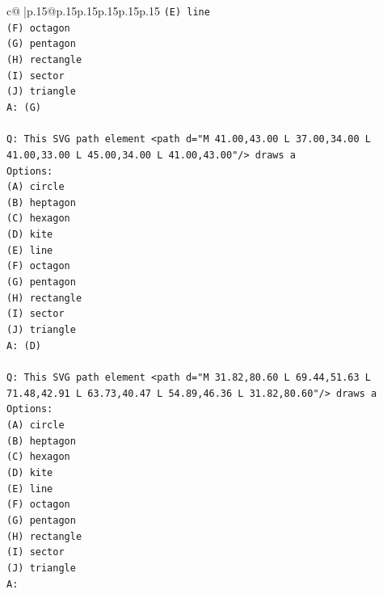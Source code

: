 \documentclass{article}
\begin{document}
{\begin{supertabular}{c@{$\;$}|p{.15\linewidth}@{}p{.15\linewidth}p{.15\linewidth}p{.15\linewidth}p{.15\linewidth}p{.15\linewidth}}
{{{\texttt{(E) line} \\
\texttt{(F) octagon} \\
\texttt{(G) pentagon} \\
\texttt{(H) rectangle} \\
\texttt{(I) sector} \\
\texttt{(J) triangle} \\
\texttt{A: (G)} \\
\\ 
\texttt{Q: This SVG path element <path d="M 41.00,43.00 L 37.00,34.00 L 41.00,33.00 L 45.00,34.00 L 41.00,43.00"/> draws a} \\
\texttt{Options:} \\
\texttt{(A) circle} \\
\texttt{(B) heptagon} \\
\texttt{(C) hexagon} \\
\texttt{(D) kite} \\
\texttt{(E) line} \\
\texttt{(F) octagon} \\
\texttt{(G) pentagon} \\
\texttt{(H) rectangle} \\
\texttt{(I) sector} \\
\texttt{(J) triangle} \\
\texttt{A: (D)} \\
\\ 
\texttt{Q: This SVG path element <path d="M 31.82,80.60 L 69.44,51.63 L 71.48,42.91 L 63.73,40.47 L 54.89,46.36 L 31.82,80.60"/> draws a} \\
\texttt{Options:} \\
\texttt{(A) circle} \\
\texttt{(B) heptagon} \\
\texttt{(C) hexagon} \\
\texttt{(D) kite} \\
\texttt{(E) line} \\
\texttt{(F) octagon} \\
\texttt{(G) pentagon} \\
\texttt{(H) rectangle} \\
\texttt{(I) sector} \\
\texttt{(J) triangle} \\
\texttt{A:} \\
            }
        }
    }
     \\ \\


\end{supertabular}}
\end{document}
